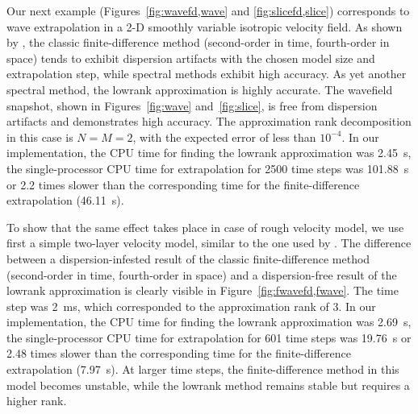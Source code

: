 


Our next example (Figures~\ref{fig:wavefd,wave} and
\ref{fig:slicefd,slice}) corresponds to wave extrapolation in a 2-D
smoothly variable isotropic velocity field. As shown by
\cite{song2010b}, the classic finite-difference method (second-order
in time, fourth-order in space) tends to exhibit dispersion artifacts
with the chosen model size and extrapolation step, while spectral
methods exhibit high accuracy. As yet another spectral method, the
lowrank approximation is highly accurate. The wavefield snapshot,
shown in Figures~\ref{fig:wave} and~\ref{fig:slice}, is free from
dispersion artifacts and demonstrates high accuracy. The approximation
rank decomposition in this case is $N=M=2$, with the expected error of
less than $10^{-4}$. In our implementation, the CPU time for
  finding the lowrank approximation was 2.45~s, the single-processor
  CPU time for extrapolation for 2500 time steps was 101.88~s or 2.2
  times slower than the corresponding time for the finite-difference
  extrapolation (46.11~s).



To show that the same effect takes place in case of rough velocity
model, we use first a simple two-layer velocity model, similar to the
one used by \cite{fowler}. The difference between a
dispersion-infested result of the classic finite-difference method
(second-order in time, fourth-order in space) and a dispersion-free
result of the lowrank approximation is clearly visible in Figure~\ref{fig:fwavefd,fwave}. The time step
was 2~ms, which corresponded to the approximation rank of 3. In
  our implementation, the CPU time for finding the lowrank
  approximation was 2.69~s, the single-processor CPU time for
  extrapolation for 601 time steps was 19.76~s or 2.48 times slower
  than the corresponding time for the finite-difference extrapolation
  (7.97~s).  At larger time steps, the finite-difference method in
this model becomes unstable, while the lowrank method remains stable
but requires a higher rank.

